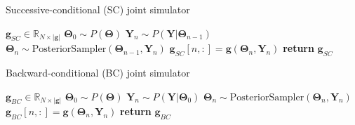 \documentclass[a4paper,11pt]{article}
\begin{document}
\begin{algorithm}
    \centering
    \caption{Successive-conditional (SC) joint simulator}\label{alg:sc-sampler}
    \begin{algorithmic}[1]
        \State {} $\mathbf{g}_{SC} \in \mathbb{R}_{N\times |\mathbf{g}|}$
        \State $\mathbf{\Theta}_{0} \sim P(\mathbf{\Theta})$ 
            \State $\mathbf{Y}_{n} \sim P(\mathbf{Y}|\mathbf{\Theta}_{n-1})$ 
            \State $\mathbf{\Theta}_{n} \sim \text{PosteriorSampler}(\mathbf{\Theta}_{n-1}, \mathbf{Y}_{n})$ 
            \State $\mathbf{g}_{SC}[n, :] = \mathbf{g}(\mathbf{\Theta}_{n}, \mathbf{Y}_{n})$ 
        \EndFor        
        \State \textbf{return} $\mathbf{g}_{SC}$
    \end{algorithmic}
\end{algorithm}

\begin{algorithm}[H]
    \centering
    \caption{Backward-conditional (BC) joint simulator}\label{alg:bc-sampler}
    \begin{algorithmic}[1]
        \State {} $\mathbf{g}_{BC} \in \mathbb{R}_{N\times |\mathbf{g}|}$
            \State $\mathbf{\Theta}_{0} \sim P(\mathbf{\Theta})$ 
            \State $\mathbf{Y}_{n} \sim P(\mathbf{Y}|\mathbf{\Theta}_{0})$ 
                \State $\mathbf{\Theta}_{n} \sim \text{PosteriorSampler}(\mathbf{\Theta}_{n}, \mathbf{Y}_{n})$
            \EndFor
            \State $\mathbf{g}_{BC}[n, :] = \mathbf{g}(\mathbf{\Theta}_{n}, \mathbf{Y}_{n})$ 
        \EndFor        
        \State \textbf{return} $\mathbf{g}_{BC}$
    \end{algorithmic}
\end{algorithm}
\end{document}
